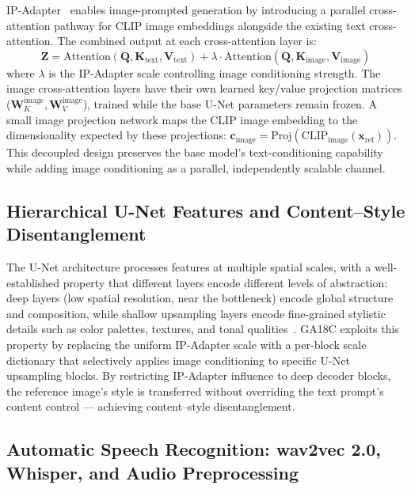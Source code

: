 \documentclass[conference]{IEEEtran}
\newcommand{\ipadapter}{IP-Adapter}
\begin{document}
\ipadapter{}~\cite{ye2023ipadapter} enables image-prompted generation by introducing a parallel cross-attention pathway for CLIP image embeddings alongside the existing text cross-attention. The combined output at each cross-attention layer is:
\begin{equation}
\mathbf{Z} = \mathrm{Attention}(\mathbf{Q}, \mathbf{K}_{\text{text}}, \mathbf{V}_{\text{text}}) + \lambda \cdot \mathrm{Attention}(\mathbf{Q}, \mathbf{K}_{\text{image}}, \mathbf{V}_{\text{image}})
\label{eq:ipadapter}
\end{equation}
where \(\lambda\) is the \ipadapter{} scale controlling image conditioning strength. The image cross-attention layers have their own learned key/value projection matrices (\(\mathbf{W}_K^{\text{image}}, \mathbf{W}_V^{\text{image}}\)), trained while the base U-Net parameters remain frozen. A small image projection network maps the CLIP image embedding to the dimensionality expected by these projections: \(\mathbf{c}_{\text{image}} = \mathrm{Proj}(\mathrm{CLIP}_{\text{image}}(\mathbf{x}_{\text{ref}}))\). This decoupled design preserves the base model's text-conditioning capability while adding image conditioning as a parallel, independently scalable channel.

\subsection{Hierarchical U-Net Features and Content--Style Disentanglement}

The U-Net architecture processes features at multiple spatial scales, with a well-established property that different layers encode different levels of abstraction: deep layers (low spatial resolution, near the bottleneck) encode global structure and composition, while shallow upsampling layers encode fine-grained stylistic details such as color palettes, textures, and tonal qualities~\cite{ronneberger2015unet}. GA18C exploits this property by replacing the uniform \ipadapter{} scale with a per-block scale dictionary that selectively applies image conditioning to specific U-Net upsampling blocks. By restricting \ipadapter{} influence to deep decoder blocks, the reference image's style is transferred without overriding the text prompt's content control --- achieving content--style disentanglement.

\subsection{Automatic Speech Recognition: wav2vec 2.0, Whisper, and Audio Preprocessing}
\end{document}
